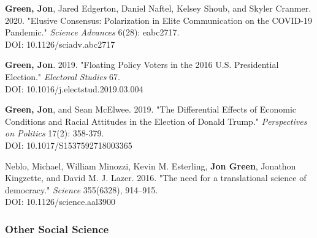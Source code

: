 \documentclass[letterpaper]{article}
\begin{document}
\begin{etaremune}
\item \textbf{Green, Jon}, Jared Edgerton, Daniel Naftel, Kelsey Shoub, and Skyler Cranmer. 2020. "Elusive Consensus: Polarization in Elite Communication on the COVID-19 Pandemic." \textit{Science Advances} 6(28): eabc2717. \\
DOI: 10.1126/sciadv.abc2717

\item \textbf{Green, Jon}. 2019. "Floating Policy Voters in the 2016 U.S. Presidential Election." \textit{Electoral Studies} 67. \\
DOI: 10.1016/j.electstud.2019.03.004

\item \textbf{Green, Jon}, and Sean McElwee. 2019. "The Differential Effects of Economic Conditions and Racial Attitudes in the Election of Donald Trump." \textit{Perspectives on Politics} 17(2): 358-379. \\
DOI: 10.1017/S1537592718003365

\item Neblo, Michael, William Minozzi, Kevin M. Esterling, \textbf{Jon Green}, Jonathon Kingzette, and David M. J. Lazer. 2016. "The need for a translational science of democracy." \textit{Science} 355(6328), 914--915.\\
DOI: 10.1126/science.aal3900
\end{etaremune}

\subsubsection*{Other Social Science}
\end{document}
